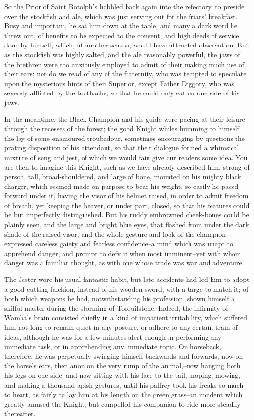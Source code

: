 So the Prior of Saint Botolph's hobbled back again into the refectory,
to preside over the stockfish and ale, which was just serving out for
the friars' breakfast. Busy and important, he sat him down at the table,
and many a dark word he threw out, of benefits to be expected to the
convent, and high deeds of service done by himself, which, at another
season, would have attracted observation. But as the stockfish was
highly salted, and the ale reasonably powerful, the jaws of the brethren
were too anxiously employed to admit of their making much use of their
ears; nor do we read of any of the fraternity, who was tempted to
speculate upon the mysterious hints of their Superior, except Father
Diggory, who was severely afflicted by the toothache, so that he could
only eat on one side of his jaws.

In the meantime, the Black Champion and his guide were pacing at their
leisure through the recesses of the forest; the good Knight whiles
humming to himself the lay of some enamoured troubadour, sometimes
encouraging by questions the prating disposition of his attendant, so
that their dialogue formed a whimsical mixture of song and jest, of
which we would fain give our readers some idea. You are then to imagine
this Knight, such as we have already described him, strong of person,
tall, broad-shouldered, and large of bone, mounted on his mighty black
charger, which seemed made on purpose to bear his weight, so easily he
paced forward under it, having the visor of his helmet raised, in order
to admit freedom of breath, yet keeping the beaver, or under part,
closed, so that his features could be but imperfectly distinguished. But
his ruddy embrowned cheek-bones could be plainly seen, and the large and
bright blue eyes, that flashed from under the dark shade of the raised
visor; and the whole gesture and look of the champion expressed careless
gaiety and fearless confidence--a mind which was unapt to apprehend
danger, and prompt to defy it when most imminent--yet with whom danger
was a familiar thought, as with one whose trade was war and adventure.

The Jester wore his usual fantastic habit, but late accidents had led
him to adopt a good cutting falchion, instead of his wooden sword, with
a targe to match it; of both which weapons he had, notwithstanding his
profession, shown himself a skilful master during the storming of
Torquilstone. Indeed, the infirmity of Wamba's brain consisted chiefly
in a kind of impatient irritability, which suffered him not long to
remain quiet in any posture, or adhere to any certain train of ideas,
although he was for a few minutes alert enough in performing any
immediate task, or in apprehending any immediate topic. On horseback,
therefore, he was perpetually swinging himself backwards and forwards,
now on the horse's ears, then anon on the very rump of the animal,--now
hanging both his legs on one side, and now sitting with his face to the
tail, moping, mowing, and making a thousand apish gestures, until his
palfrey took his freaks so much to heart, as fairly to lay him at his
length on the green grass--an incident which greatly amused the Knight,
but compelled his companion to ride more steadily thereafter.

